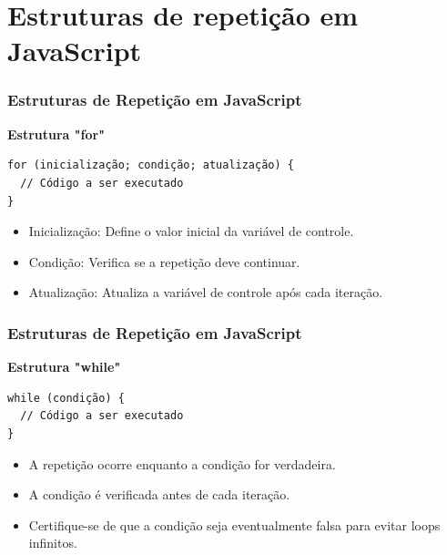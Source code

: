 \documentclass[13pt, xcolor={dvipsnames,svgnames}, portuguese]{beamer}
\begin{document}
\section{Estruturas de repetição em JavaScript}

\begin{frame}[fragile]
\frametitle{Estruturas de Repetição em JavaScript}

\textbf{Estrutura "for"}

\begin{verbatim}
for (inicialização; condição; atualização) {
  // Código a ser executado
}
\end{verbatim}

\begin{itemize}
  \item Inicialização: Define o valor inicial da variável de controle.
  \item Condição: Verifica se a repetição deve continuar.
  \item Atualização: Atualiza a variável de controle após cada iteração.
\end{itemize}

\end{frame}
\begin{frame}[fragile]
\frametitle{Estruturas de Repetição em JavaScript}

\textbf{Estrutura "while"}

\begin{verbatim}
while (condição) {
  // Código a ser executado
}
\end{verbatim}

\begin{itemize}
  \item A repetição ocorre enquanto a condição for verdadeira.
  \item A condição é verificada antes de cada iteração.
  \item Certifique-se de que a condição seja eventualmente falsa para evitar loops infinitos.
\end{itemize}

\end{frame}
\end{document}
